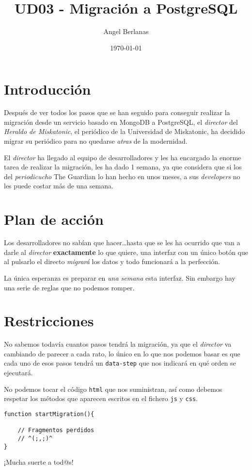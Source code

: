 \documentclass[11pt]{article}
\author{Angel Berlanas}
\date{\today}
\title{UD03 - Migración a PostgreSQL}
\begin{document}
\maketitle
\tableofcontents


\section{Introducción}
\label{sec-1}

Después de ver todos los pasos que se han seguido para conseguir 
realizar la migración desde un servicio basado en MongoDB a PostgreSQL, el
\emph{director} del \emph{Heraldo de Miskatonic}, el periódico de la Universidad de
Miskatonic, ha decidido migrar su periódico para no quedarse \emph{atras} de la
modernidad.

El \emph{director} ha llegado al equipo de desarrolladores y les ha encargado la
enorme tarea de realizar la migración, les ha dado 1 semana, ya que considera
que si los del \emph{periodicucho} The Guardian lo han hecho en unos meses, a sus
\emph{developers} no les puede costar más de una semana.

\section{Plan de acción}
\label{sec-2}

Los desarrolladores no sabían que hacer\ldots{}hasta que se les ha ocurrido que van
a darle al \emph{director} \textbf{exactamente} lo que quiere, una interfaz con un único
botón que al pulsarlo el directo \emph{migrará} los datos y todo funcionará a la
perfección.

La única esperanza es preparar en \emph{una semana} esta interfaz. Sin embargo hay
una serie de reglas que no podemos romper.

\section{Restricciones}
\label{sec-3}

No sabemos todavía cuantos pasos tendrá la migración, ya que el \emph{director} va
cambiando de parecer a cada rato, lo único en lo que nos podemos basar es que
cada uno de esos pasos tendrá un \verb~data-step~ que nos indicará en qué orden se
ejecutará.

No podemos tocar el código \verb~html~ que nos suministran, así como debemos
respetar los métodos que aparecen escritos en el fichero \verb~js~ y \verb~css~.

\begin{verbatim}
function startMigration(){

    // Fragmentos perdidos
    // ^(;,;)^
}
\end{verbatim}

¡Mucha suerte a tod@s!
\end{document}
